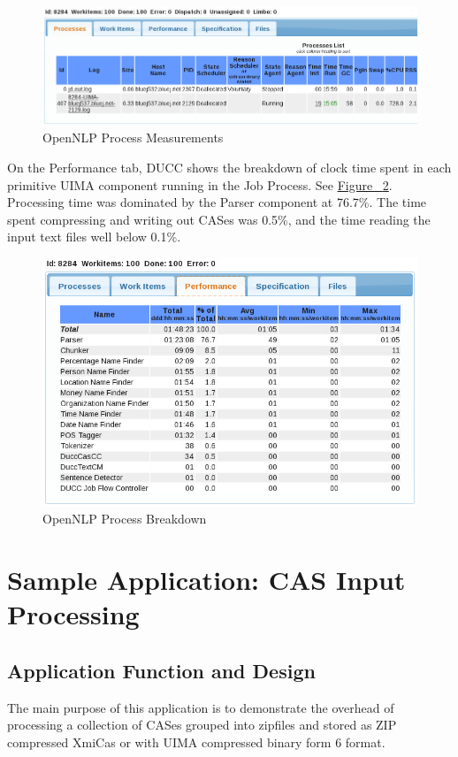 \begin{figure}[H]
  \centering
  \includegraphics[width=7in]{images/BooksRaw.png}
  \caption{OpenNLP Process Measurements}
  \label{fig:OpenNLP-Process-Measurements}
\end{figure}

On the Performance tab, DUCC shows the breakdown of clock time spent in each primitive UIMA component running in the 
Job Process. See \hyperref[fig:OpenNLP-Process-Breakdown]{Figure ~\ref{fig:OpenNLP-Process-Breakdown}}.
Processing time was dominated by the Parser component at 76.7\%. The time spent compressing and writing out CASes 
was 0.5\%, and the time reading the input text files well below 0.1\%.

\begin{figure}[H]
  \centering
  \includegraphics[width=5.5in]{images/BooksRawPerf.png}
  \caption{OpenNLP Process Breakdown}
  \label{fig:OpenNLP-Process-Breakdown}
\end{figure}


\chapter{Sample Application: CAS Input Processing}

\section{Application Function and Design}
The main purpose of this application is to demonstrate the overhead of processing a collection of CASes grouped into 
zipfiles and stored as ZIP compressed XmiCas or with UIMA compressed binary form 6 format.


